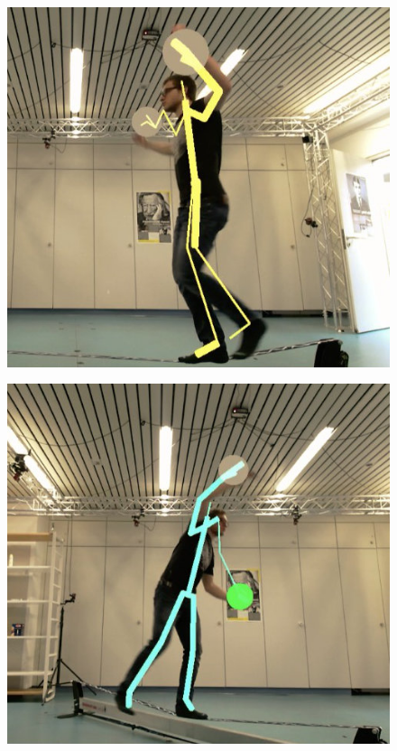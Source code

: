 \begin{figure}[htb]
	\centering
	\begin{minipage}[t]{0.32\linewidth}
		\centering
		\includegraphics[width=1\linewidth]{Pictures/5_3_slacklineSideways}
		\label{fig:5_3_slacklineSideways}
	\end{minipage}
	\hfill
	\begin{minipage}[t]{0.32\linewidth}
		\centering
		\includegraphics[width=1\linewidth]{Pictures/5_3_slacklineDiagonal}

\end{minipage}
\end{figure}
